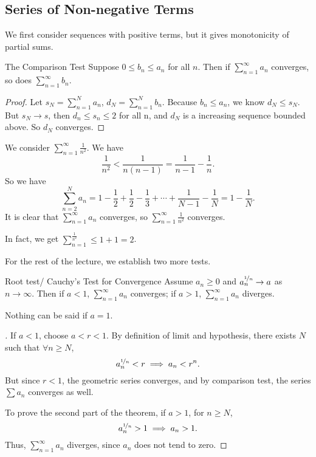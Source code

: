 \subsection{Series of Non-negative Terms}
We first consider sequences with positive terms, but it gives monotonicity of partial sums.
\begin{theorem}{The Comparison Test}{}
    Suppose \(0\leq b_n\leq a_n\) for all \(n\). Then if \(\sum\limits_{n=1}^{\infty} a_n\) converges, so does \(\sum\limits_{n=1}^{\infty} b_n\).
\end{theorem}
\begin{proof}
    Let \(s_N = \sum\limits_{n=1}^{N} a_n\), \(d_N = \sum\limits_{n=1}^{N} b_n\). Because \(b_n \leq a_n\), we know \(d_N \leq s_N\). But \(s_N \to s\), then \(d_n \leq s_n \leq 2\) for all n, and \(d_N\) is a increasing sequence bounded above. So \(d_N\) converges.
\end{proof}
\begin{example}
    We consider \(\sum\limits_{n=1}^{\infty} \frac{1}{n^2}\). We have
    \[
        \frac{1}{n^2} < \frac{1}{n(n-1)} = \frac{1}{n - 1}-\frac{1}{n}.
    \]
    So we have
    \[
        \sum\limits_{n=2}^{N} a_n = 1 - \frac{1}{2} + \frac{1}{2}- \frac{1}{3}+\cdots+\frac{1}{N-1}-\frac{1}{N} = 1 - \frac{1}{N}.
    \]
    It is clear that \(\sum\limits_{n=1}^{\infty} a_n\) converges, so \(\sum\limits_{n=1}^{\infty} \frac{1}{n^{2}}\) converges.

    In fact, we get \(\sum\limits_{n=1}^{\frac{1}{n^2}} \leq 1 + 1 = 2\).
\end{example}
For the rest of the lecture, we establish two more tests.
\begin{theorem}{Root test/ Cauchy's Test for Convergence}{}
    Assume \(a_n \geq 0\) and \(a_n^{\nicefrac{1}{n}}\to a\) as \(n\to \infty\). Then if \(a<1\), \(\sum\limits_{n=1}^{\infty} a_n\) converges; if \(a>1\), \(\sum\limits_{n=1}^{\infty} a_n\) diverges.
\end{theorem}
\begin{remark}
    Nothing can be said if \(a=1\).
\end{remark}
\begin{proof}[]
    If \(a<1\), choose \(a<r<1\). By definition of limit and hypothesis, there exists \(N\) such that \(\forall n \geq N\),
    \[
        a_n^{\nicefrac{1}{n}}<r \implies a_n < r^n.
    \]
    But since \(r<1\), the geometric series converges, and by comparison test, the series \(\sum a_n\) converges as well.

    To prove the second part of the theorem, if \(a>1\), for \(n\geq N\),
    \[a_n^{\nicefrac{1}{n}}>1\implies a_n > 1.\]
    Thus, \(\sum\limits_{n=1}^{\infty} a_{n}\) diverges, since \(a_n\) does not tend to zero.
\end{proof}
